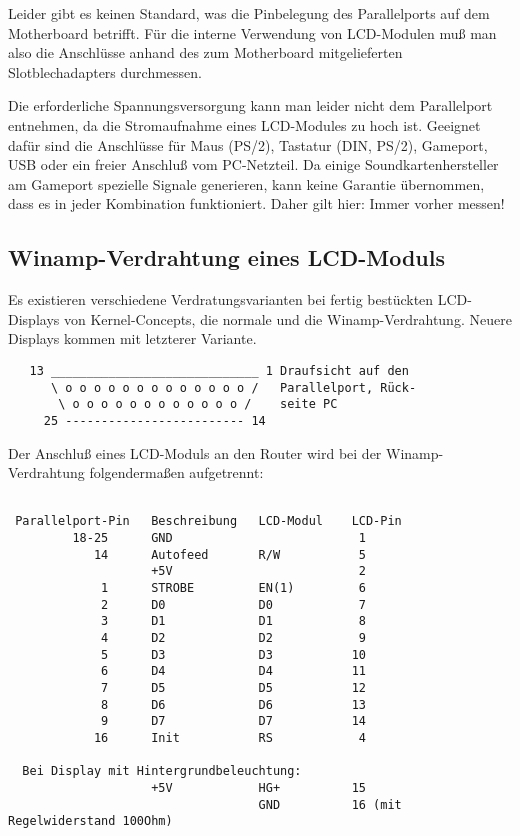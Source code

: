   Leider gibt es keinen Standard, was die Pinbelegung des Parallelports
  auf dem Motherboard betrifft. Für die interne Verwendung von LCD-Modulen
  muß man also die Anschlüsse anhand des zum Motherboard mitgelieferten
  Slotblechadapters durchmessen.

  Die erforderliche Spannungsversorgung kann man leider nicht dem Parallelport
  entnehmen, da die Stromaufnahme eines LCD-Modules zu hoch ist. Geeignet dafür
  sind die Anschlüsse für Maus (PS/2), Tastatur (DIN, PS/2), Gameport, USB oder ein
  freier Anschluß vom PC-Netzteil. Da einige Soundkartenhersteller am Gameport
  spezielle Signale generieren, kann keine Garantie übernommen, dass es in jeder
  Kombination funktioniert. Daher gilt hier: Immer vorher messen!

\subsection{Winamp-Verdrahtung eines LCD-Moduls}
 
  Es existieren verschiedene Verdratungsvarianten bei fertig bestückten
  LCD-Displays von Kernel-Concepts, die normale und die
  Winamp-Verdrahtung. Neuere Displays kommen mit letzterer Variante.
 
\begin{example}
\begin{verbatim}
   13 _____________________________ 1 Draufsicht auf den
      \ o o o o o o o o o o o o o /   Parallelport, Rück-
       \ o o o o o o o o o o o o /    seite PC
     25 ------------------------- 14
\end{verbatim}
\end{example}
   

 Der Anschluß eines LCD-Moduls an den Router wird bei der Winamp-Verdrahtung
 folgendermaßen aufgetrennt:

 
\begin{example}
\begin{verbatim}
 
 Parallelport-Pin   Beschreibung   LCD-Modul    LCD-Pin
         18-25      GND                          1
            14      Autofeed       R/W           5
                    +5V                          2
             1      STROBE         EN(1)         6
             2      D0             D0            7
             3      D1             D1            8
             4      D2             D2            9
             5      D3             D3           10
             6      D4             D4           11
             7      D5             D5           12
             8      D6             D6           13
             9      D7             D7           14
            16      Init           RS            4

  Bei Display mit Hintergrundbeleuchtung:
                    +5V            HG+          15
                                   GND          16 (mit Regelwiderstand 100Ohm)
\end{verbatim}
\end{example}

